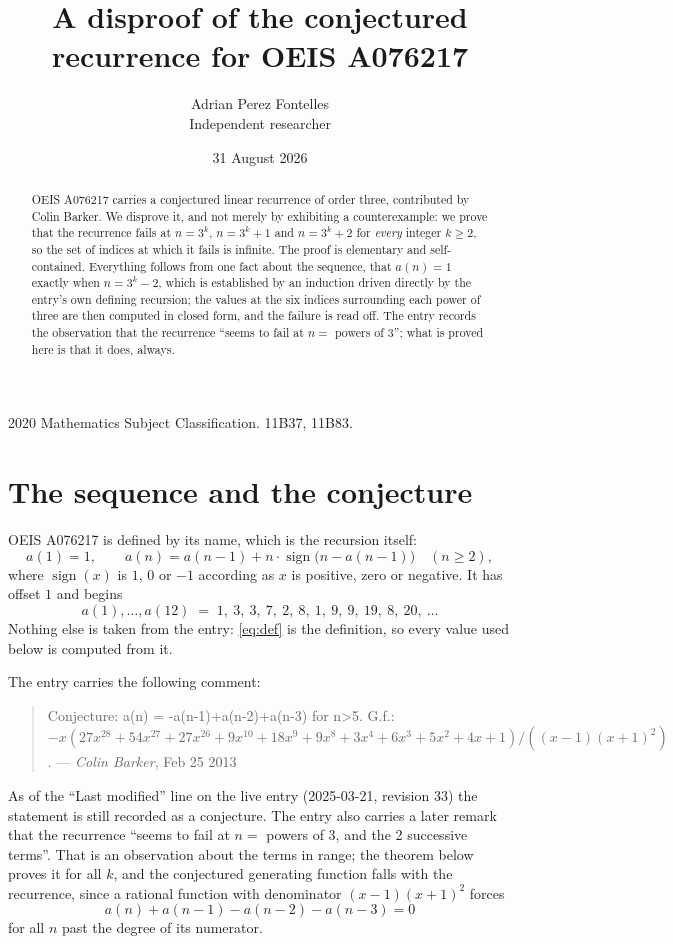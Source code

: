 \documentclass[11pt,a4paper]{article}
\title{A disproof of the conjectured recurrence for OEIS A076217}
\author{Adrian Perez Fontelles\\ \small Independent researcher}
\date{31 August 2026}
\theoremstyle{plain}
\theoremstyle{definition}
\begin{document}
\maketitle

\begin{abstract}
OEIS A076217 carries a conjectured linear recurrence of order three, contributed by Colin
Barker. We disprove it, and not merely by exhibiting a counterexample: we prove that the
recurrence fails at $n=3^{k}$, $n=3^{k}+1$ and $n=3^{k}+2$ for \emph{every} integer
$k\ge 2$, so the set of indices at which it fails is infinite. The proof is elementary and
self-contained. Everything follows from one fact about the sequence, that $a(n)=1$ exactly
when $n=3^{k}-2$, which is established by an induction driven directly by the entry's own
defining recursion; the values at the six indices surrounding each power of three are then
computed in closed form, and the failure is read off. The entry records the observation
that the recurrence ``seems to fail at $n=$ powers of $3$''; what is proved here is that it
does, always.
\end{abstract}

\noindent\small 2020 Mathematics Subject Classification. 11B37, 11B83.\normalsize

\section{The sequence and the conjecture}

OEIS A076217 is defined by its name, which is the recursion itself:
\begin{equation}\label{eq:def}
a(1)=1,\qquad a(n)=a(n-1)+n\cdot\operatorname{sign}\bigl(n-a(n-1)\bigr)\quad(n\ge2),
\end{equation}
where $\operatorname{sign}(x)$ is $1$, $0$ or $-1$ according as $x$ is positive, zero or
negative. It has offset $1$ and begins
\[
a(1),\dots,a(12)\;=\;1,\ 3,\ 3,\ 7,\ 2,\ 8,\ 1,\ 9,\ 9,\ 19,\ 8,\ 20,\ \dots
\]
Nothing else is taken from the entry: \eqref{eq:def} is the definition, so every value used
below is computed from it.

The entry carries the following comment:
\begin{quote}\small
Conjecture: a(n) = -a(n-1)+a(n-2)+a(n-3) for n>5. G.f.: $-x(27x^{28}+54x^{27}+27x^{26}
+9x^{10}+18x^{9}+9x^{8}+3x^{4}+6x^{3}+5x^{2}+4x+1)/((x-1)(x+1)^{2})$. --- \emph{Colin
Barker}, Feb 25 2013
\end{quote}
As of the ``Last modified'' line on the live entry (2025-03-21, revision 33) the statement
is still recorded as a conjecture. The entry also carries a later remark that the
recurrence ``seems to fail at $n=$ powers of 3, and the 2 successive terms''. That is an
observation about the terms in range; the theorem below proves it for all $k$, and the
conjectured generating function falls with the recurrence, since a rational function with
denominator $(x-1)(x+1)^{2}$ forces
\begin{equation}\label{eq:conj}
a(n)+a(n-1)-a(n-2)-a(n-3)=0
\end{equation}
for all $n$ past the degree of its numerator.
\end{document}
